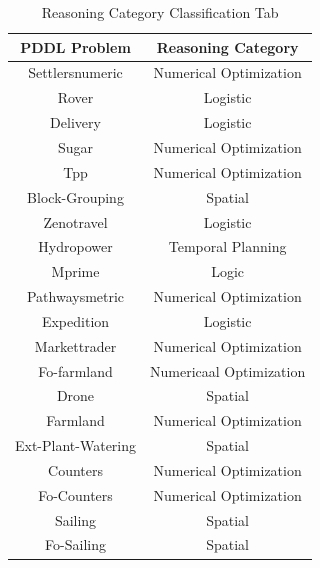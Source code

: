 \documentclass[a4paper]{article}
\begin{document}
    \begin{table}[H]
        \centering
        \renewcommand{\arraystretch}{1.25} 
        
        \begin{tabular}{c|c}
            \toprule
            
            \textbf{PDDL Problem} & \textbf{Reasoning Category} \\
            
            \midrule[1pt]
            \addlinespace[0.25cm]
            Settlersnumeric & Numerical Optimization \\
            \midrule
            Rover & Logistic \\
            \midrule
            Delivery & Logistic \\
            \midrule
            Sugar & Numerical Optimization \\
            \midrule
            Tpp & Numerical Optimization \\
            \midrule
            Block-Grouping & Spatial \\
            \midrule
            Zenotravel & Logistic \\
            \midrule
            Hydropower & Temporal Planning \\
            \midrule
            Mprime & Logic \\
            \midrule
            Pathwaysmetric & Numerical Optimization \\
            \midrule
            Expedition & Logistic \\
            \midrule
            Markettrader & Numerical Optimization \\
            \midrule
            Fo-farmland & Numericaal Optimization \\
            \midrule
            Drone & Spatial \\
            \midrule
            Farmland & Numerical Optimization \\
            \midrule
            Ext-Plant-Watering & Spatial \\
            \midrule
            Counters & Numerical Optimization \\
            \midrule
            Fo-Counters & Numerical Optimization \\
            \midrule
            Sailing & Spatial \\
            \midrule
            Fo-Sailing & Spatial \\
            
        \end{tabular}
        \vspace{0.2cm}
        \caption{Reasoning Category Classification Tab}
        \label{tab:dati_pfile_griglia}
    \end{table}
\end{document}
